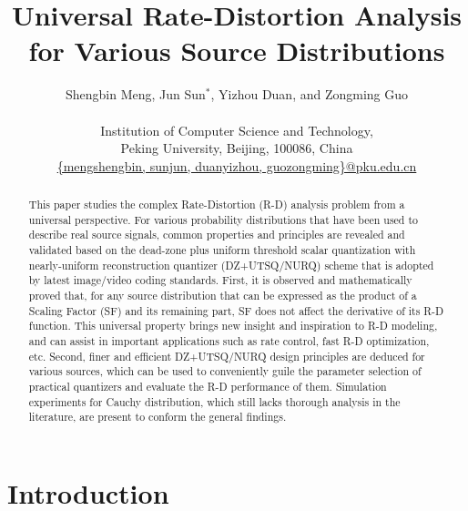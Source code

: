 \documentclass[smallabstract,smallcaptions]{dccpaper}
\begin{document}
\title
{\large
\textbf{Universal Rate-Distortion Analysis for Various Source Distributions}
}

\author{%
Shengbin Meng, Jun Sun$^{\ast}$, Yizhou Duan, and Zongming Guo\\[0.5em]
{\small\begin{minipage}{\linewidth}\begin{center}
\begin{tabular}{ccc}
Institution of Computer Science and Technology, \\
Peking University, Beijing, 100086, China\\
\url{{mengshengbin, sunjun, duanyizhou, guozongming}@pku.edu.cn}
\end{tabular}
\end{center}\end{minipage}}
}

\maketitle
\thispagestyle{empty}

\begin{abstract}
This paper studies the complex Rate-Distortion (R-D) analysis problem from a universal perspective. For various probability distributions that have been used to describe real source signals, common properties and principles are revealed and validated based on the dead-zone plus uniform threshold scalar quantization with nearly-uniform reconstruction quantizer (DZ+UTSQ/NURQ) scheme that is adopted by latest image/video coding standards. First, it is observed and mathematically proved that, for any source distribution that can be expressed as the product of a Scaling Factor (SF) and its remaining part, SF does not affect the derivative of its R-D function. This universal property brings new insight and inspiration to R-D modeling, and can assist in important applications such as rate control, fast R-D optimization, etc. Second, finer and efficient DZ+UTSQ/NURQ design principles are deduced for various sources, which can be used to conveniently guile the parameter selection of practical quantizers and evaluate the R-D performance of them. Simulation experiments for Cauchy distribution, which still lacks thorough analysis in the literature, are present to conform the general findings.
\end{abstract}

\section{Introduction}
\end{document}
